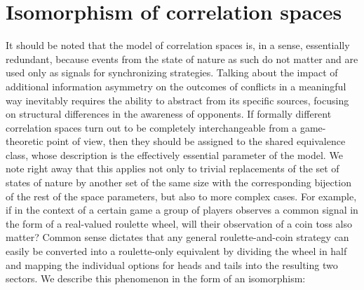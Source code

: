 \section{Isomorphism of correlation spaces}\label{sec:ch1/sec2}

It should be noted that the model of correlation spaces is, in a sense, essentially redundant, because events from the state of nature as such do not matter and are used only as signals for synchronizing strategies. Talking about the impact of additional information asymmetry on the outcomes of conflicts in a meaningful way inevitably requires the ability to abstract from its specific sources, focusing on structural differences in the awareness of opponents. If formally different correlation spaces turn out to be completely interchangeable from a game-theoretic point of view, then they should be assigned to the shared equivalence class, whose description is the effectively essential parameter of the model. We note right away that this applies not only to trivial replacements of the set of states of nature by another set of the same size with the corresponding bijection of the rest of the space parameters, but also to more complex cases. For example, if in the context of a certain game a group of players observes a common signal in the form of a real-valued roulette wheel, will their observation of a coin toss also matter? Common sense dictates that any general roulette-and-coin strategy can easily be converted into a roulette-only equivalent by dividing the wheel in half and mapping the individual options for heads and tails into the resulting two sectors. We describe this phenomenon in the form of an isomorphism: %
